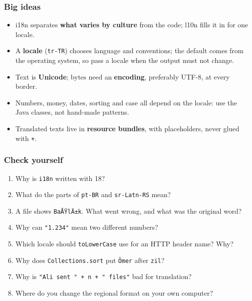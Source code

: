 \documentclass[aspectratio=169,10pt,compress]{beamer}
\begin{document}
\begin{frame}[t,fragile] \frametitle{Big ideas}
  \begin{itemize}
    \item i18n separates \textbf{what varies by culture} from the code; l10n fills it in for one locale.
    \item A \textbf{locale} (\texttt{tr-TR}) chooses language and conventions; the default comes from the
      operating system, so pass a locale when the output must not change.
    \item Text is \textbf{Unicode}; bytes need an \textbf{encoding}, preferably UTF-8, at every border.
    \item Numbers, money, dates, sorting and case all depend on the locale: use the Java classes, not
      hand-made patterns.
    \item Translated texts live in \textbf{resource bundles}, with placeholders, never glued with \texttt{+}.
  \end{itemize}
\end{frame}




\begin{frame}[t,fragile] \frametitle{Check yourself}
  \begin{enumerate}\small
    \item Why is \texttt{i18n} written with 18?
    \item What do the parts of \texttt{pt-BR} and \texttt{sr-Latn-RS} mean?
    \item A file shows \texttt{BaÅŸlÄ±k}. What went wrong, and what was the original word?
    \item Why can \texttt{"1.234"} mean two different numbers?
    \item Which locale should \texttt{toLowerCase} use for an HTTP header name? Why?
    \item Why does \texttt{Collections.sort} put \texttt{Ömer} after \texttt{zil}?
    \item Why is \texttt{"Ali sent " + n + " files"} bad for translation?
    \item Where do you change the regional format on your own computer?
  \end{enumerate}
\end{frame}




\begin{frame}[t,fragile]
	\begin{center}
		\vspace{4cm}
	\end{center}
\end{frame}
\end{document}
